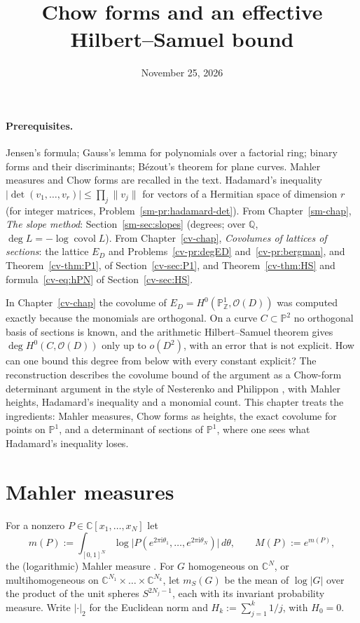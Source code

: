 \documentclass[reqno]{amsart}
\title{Chow forms and an effective Hilbert--Samuel bound}
\author{}
\date{November 25, 2026}
\newcounter{chap}
\theoremstyle{definition}
\theoremstyle{plain}
\newcommand{\Z}{\mathbb{Z}}
\newcommand{\Q}{\mathbb{Q}}
\newcommand{\C}{\mathbb{C}}
\newcommand{\Pb}{\mathbb{P}}
\newcommand{\ii}{\mathrm{i}}
\newcommand{\covol}{\operatorname{covol}}
\newcommand{\mS}{m_{S}}
\begin{document}
\maketitle
{}\label{chap}

\paragraph{Prerequisites.}
Jensen's formula; Gauss's lemma for polynomials over a factorial ring; binary forms and their discriminants; B\'ezout's theorem for plane curves.  Mahler measures \cite[\S1.6]{BG} and Chow forms \cite[Chs.~3--4]{GKZ} are recalled in the text.  Hadamard's inequality \(\lvert\det(v_1, \dots, v_r)\rvert \le \prod_j \lVert v_j \rVert\) for vectors of a Hermitian space of dimension \(r\) (for integer matrices, Problem~\ref{sm-pr:hadamard-det}).  From Chapter~\ref{sm-chap}, \emph{The slope method}: Section~\ref{sm-sec:slopes} (degrees; over \(\Q\), \(\deg L = -\log\covol L\)).  From Chapter~\ref{cv-chap}, \emph{Covolumes of lattices of sections}: the lattice \(E_D\) and Problems~\ref{cv-pr:degED} and~\ref{cv-pr:bergman}, and Theorem~\ref{cv-thm:P1}, of Section~\ref{cv-sec:P1}, and Theorem~\ref{cv-thm:HS} and formula~\eqref{cv-eq:hPN} of Section~\ref{cv-sec:HS}.

In Chapter~\ref{cv-chap} the covolume of \(E_D = H^0(\Pb^1_\Z, \mathcal O(D))\) was computed exactly because the monomials are orthogonal.  On a curve \(C \subset \Pb^2\) no orthogonal basis of sections is known, and the arithmetic Hilbert--Samuel theorem gives \(\deg H^0(C, \mathcal O(D))\) only up to \(o(D^2)\), with an error that is not explicit.  How can one bound this degree from below with every constant explicit?  The reconstruction \cite[proof dependency map, item HSAt]{Adr} describes the covolume bound of the argument as a Chow-form determinant argument in the style of Nesterenko and Philippon \cite{NP}, with Mahler heights, Hadamard's inequality and a monomial count.  This chapter treats the ingredients: Mahler measures, Chow forms as heights, the exact covolume for points on \(\Pb^1\), and a determinant of sections of \(\Pb^1\), where one sees what Hadamard's inequality loses.

\section{Mahler measures}\label{sec:mahler}

For a nonzero \(P \in \C[x_1, \dots, x_N]\) let
\[
  m(P) := \int_{[0,1]^N} \log\bigl\lvert P(e^{2\pi\ii\theta_1}, \dots, e^{2\pi\ii\theta_N})\bigr\rvert \, d\theta , \qquad M(P) := e^{m(P)} ,
\]
the (logarithmic) Mahler measure \cite[\S1.6]{BG}.  For \(G\) homogeneous on \(\C^N\), or multihomogeneous on \(\C^{N_1} \times \dots \times \C^{N_k}\), let \(\mS(G)\) be the mean of \(\log\lvert G \rvert\) over the product of the unit spheres \(S^{2N_j - 1}\), each with its invariant probability measure.  Write \(\lvert\cdot\rvert_2\) for the Euclidean norm and \(H_k := \sum_{j=1}^{k} 1/j\), with \(H_0 = 0\).
\end{document}
